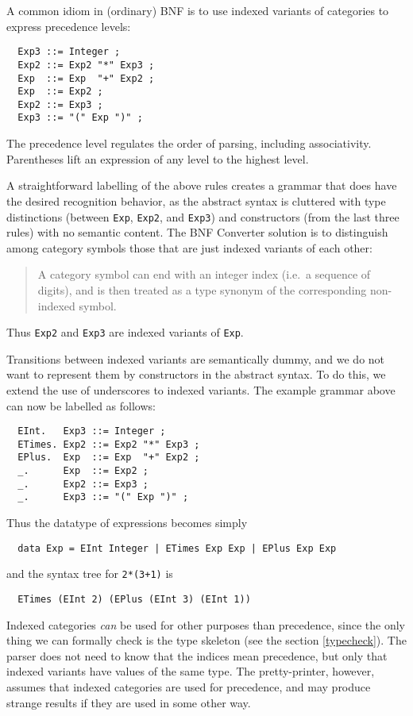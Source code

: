 \documentclass[10pt]{article}
\newcommand{\bequ}{\begin{quote}}
\newcommand{\enqu}{\end{quote}}
\begin{document}
A common idiom in (ordinary) BNF is to use indexed variants of categories
to express precedence levels:
\begin{verbatim}
  Exp3 ::= Integer ;
  Exp2 ::= Exp2 "*" Exp3 ;
  Exp  ::= Exp  "+" Exp2 ;
  Exp  ::= Exp2 ;
  Exp2 ::= Exp3 ;
  Exp3 ::= "(" Exp ")" ;
\end{verbatim}
The precedence level regulates the order of parsing, including
associativity. Parentheses lift an expression of any level
to the highest level.

A straightforward labelling of the above rules creates a grammar that does
have the desired recognition behavior, as the abstract syntax is cluttered
with type distinctions (between {\tt Exp}, {\tt Exp2}, and {\tt Exp3})
and constructors (from the last three rules) with no semantic content.
The BNF Converter solution is to distinguish among
category symbols those that are just indexed variants of each other:
\bequ
A category symbol can end with an integer index
(i.e.\ a sequence of digits), and is then treated as a type
synonym of the corresponding non-indexed symbol.
\enqu
Thus {\tt Exp2} and {\tt Exp3} are indexed variants of {\tt Exp}.

Transitions between indexed variants are
semantically dummy, and we do not want to represent them by
constructors in the abstract syntax. To do this, we extend the use
of underscores to indexed variants.
The example grammar above can now be labelled as follows:
\begin{verbatim}
  EInt.   Exp3 ::= Integer ;
  ETimes. Exp2 ::= Exp2 "*" Exp3 ;
  EPlus.  Exp  ::= Exp  "+" Exp2 ;
  _.      Exp  ::= Exp2 ;
  _.      Exp2 ::= Exp3 ;
  _.      Exp3 ::= "(" Exp ")" ;
\end{verbatim}
Thus the datatype of expressions becomes simply
\begin{verbatim}
  data Exp = EInt Integer | ETimes Exp Exp | EPlus Exp Exp
\end{verbatim}
and the syntax tree for {\tt 2*(3+1)} is
\begin{verbatim}
  ETimes (EInt 2) (EPlus (EInt 3) (EInt 1))
\end{verbatim}

Indexed categories {\em can} be used for other purposes than
precedence, since the only thing we can formally check is the
type skeleton (see the section \ref{typecheck}).
The parser does not need to know
that the indices mean precedence, but only that indexed
variants have values of the same type.
The pretty-printer, however, assumes that
indexed categories are used for precedence, and may produce
strange results if they are used in some other way.
\end{document}
